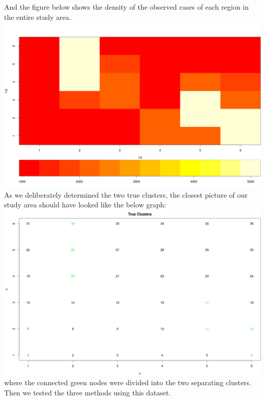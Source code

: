 \documentclass[12pt]{article}
\begin{document}
	And the figure below shows the density of the observed cases of each region in the entire study area.\\
	\includegraphics[scale=0.2]{density_cases}\\
	
	As we deliberately determined the two true clusters, the closest picture of our study area should have looked like the below graph: \\
	
	\includegraphics[scale=0.25]{true_clusters}\\ where the connected green nodes were divided into the two separating clusters. \\
	
	Then we tested the three methods using this dataset. \\
	
\end{document}
